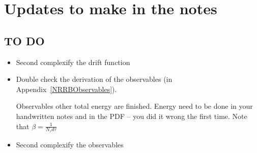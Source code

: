\documentclass[../RotatingBosons.tex]{subfiles}
\begin{document}
\section{Updates to make in the notes}
\subsection{TO DO}
\begin{itemize}
	\item Second complexify the drift function
	\item Double check the derivation of the observables (in Appendix~\ref{NRRBObservables}).
	
	Observables other total energy are finished. Energy need to be done in your handwritten notes and in the PDF -- you did it wrong the first time. Note that $\beta = \frac{1}{N_{\tau}d\tau}$
	
	\item Second complexify the observables
\end{itemize}
\end{document}

